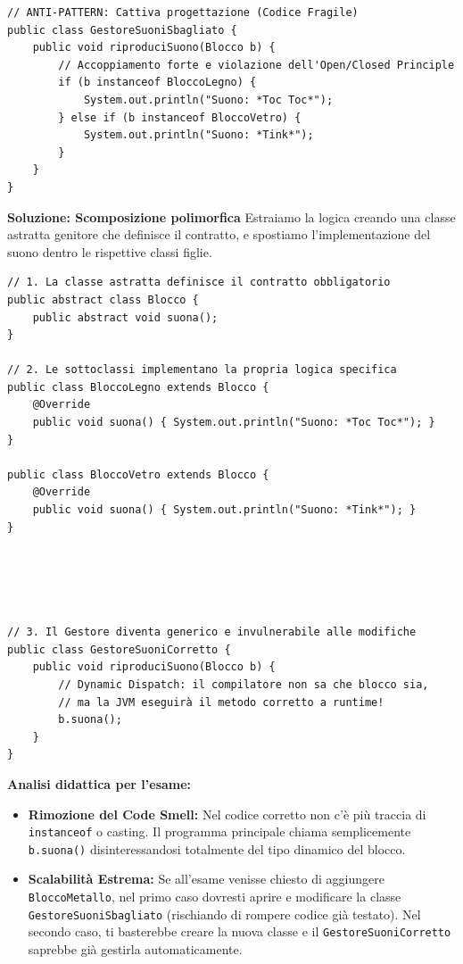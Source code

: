\documentclass[12pt, a4paper]{article}
\begin{document}
\begin{verbatim}
// ANTI-PATTERN: Cattiva progettazione (Codice Fragile)
public class GestoreSuoniSbagliato {
    public void riproduciSuono(Blocco b) {
        // Accoppiamento forte e violazione dell'Open/Closed Principle
        if (b instanceof BloccoLegno) {
            System.out.println("Suono: *Toc Toc*");
        } else if (b instanceof BloccoVetro) {
            System.out.println("Suono: *Tink*");
        }
    }
}
\end{verbatim}

\textbf{Soluzione: Scomposizione polimorfica}
Estraiamo la logica creando una classe astratta genitore che definisce il contratto, e spostiamo l'implementazione del suono dentro le rispettive classi figlie.

\begin{verbatim}
// 1. La classe astratta definisce il contratto obbligatorio
public abstract class Blocco {
    public abstract void suona();
}

// 2. Le sottoclassi implementano la propria logica specifica
public class BloccoLegno extends Blocco {
    @Override
    public void suona() { System.out.println("Suono: *Toc Toc*"); }
}

public class BloccoVetro extends Blocco {
    @Override
    public void suona() { System.out.println("Suono: *Tink*"); }
}





// 3. Il Gestore diventa generico e invulnerabile alle modifiche
public class GestoreSuoniCorretto {
    public void riproduciSuono(Blocco b) {
        // Dynamic Dispatch: il compilatore non sa che blocco sia, 
        // ma la JVM eseguirà il metodo corretto a runtime!
        b.suona();
    }
}
\end{verbatim}

\textbf{Analisi didattica per l'esame:}
\begin{itemize}
    \item \textbf{Rimozione del Code Smell:} Nel codice corretto non c'è più traccia di \texttt{instanceof} o casting. Il programma principale chiama semplicemente \texttt{b.suona()} disinteressandosi totalmente del tipo dinamico del blocco.
    \item \textbf{Scalabilità Estrema:} Se all'esame venisse chiesto di aggiungere \texttt{BloccoMetallo}, nel primo caso dovresti aprire e modificare la classe \texttt{GestoreSuoniSbagliato} (rischiando di rompere codice già testato). Nel secondo caso, ti basterebbe creare la nuova classe e il \texttt{GestoreSuoniCorretto} saprebbe già gestirla automaticamente.
\end{itemize}
\end{document}
